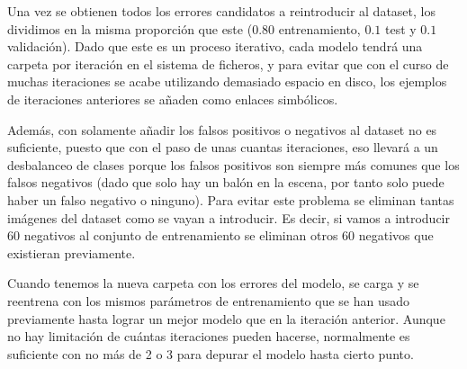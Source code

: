 Una vez se obtienen todos los errores candidatos a reintroducir al dataset, los dividimos en la misma proporción que este ($0.80$ entrenamiento, $0.1$ test y $0.1$ validación). Dado que este es un proceso iterativo, cada modelo tendrá una carpeta por iteración en el sistema de ficheros, y para evitar que con el curso de muchas iteraciones se acabe utilizando demasiado espacio en disco, los ejemplos de iteraciones anteriores se añaden como enlaces simbólicos.

Además, con solamente añadir los falsos positivos o negativos al dataset no es suficiente, puesto que con el paso de unas cuantas iteraciones, eso llevará a un desbalanceo de clases porque los falsos positivos son siempre más comunes que los falsos negativos (dado que solo hay un balón en la escena, por tanto solo puede haber un falso negativo o ninguno). Para evitar este problema se eliminan tantas imágenes del dataset como se vayan a introducir. Es decir, si vamos a introducir 60 negativos al conjunto de entrenamiento se eliminan otros 60 negativos que existieran previamente.

Cuando tenemos la nueva carpeta con los errores del modelo, se carga y se reentrena con los mismos parámetros de entrenamiento que se han usado previamente hasta lograr un mejor modelo que en la iteración anterior. Aunque no hay limitación de cuántas iteraciones pueden hacerse, normalmente es suficiente con no más de 2 o 3 para depurar el modelo hasta cierto punto.

